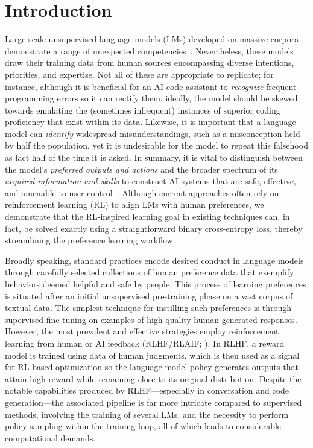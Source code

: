 \section{Introduction}
Large-scale unsupervised language models (LMs) developed on massive corpora demonstrate a range of unexpected competencies~\citep{chowdhery2022palm, brown2020language, touvron2023llama,bubeck2023sparks}. Nevertheless, these models draw their training data from human sources encompassing diverse intentions, priorities, and expertise. Not all of these are appropriate to replicate; for instance, although it is beneficial for an AI code assistant to \textit{recognize} frequent programming errors so it can rectify them, ideally, the model should be skewed towards emulating the (sometimes infrequent) instances of superior coding proficiency that exist within its data. Likewise, it is important that a language model can \textit{identify} widespread misunderstandings, such as a misconception held by half the population, yet it is undesirable for the model to repeat this falsehood as fact half of the time it is asked. In summary, it is vital to distinguish between the model's \emph{preferred outputs and actions} and the broader spectrum of its \textit{acquired information and skills} to construct AI systems that are safe, effective, and amenable to user control~\citep{ouyang2022training}. Although current approaches often rely on reinforcement learning (RL) to align LMs with human preferences, we demonstrate that the RL-inspired learning goal in existing techniques can, in fact, be solved exactly using a straightforward binary cross-entropy loss, thereby streamlining the preference learning workflow.

Broadly speaking, standard practices encode desired conduct in language models through carefully selected collections of human preference data that exemplify behaviors deemed helpful and safe by people. This process of learning preferences is situated after an initial unsupervised pre-training phase on a vast corpus of textual data. The simplest technique for instilling such preferences is through supervised fine-tuning on examples of high-quality human-generated responses. However, the most prevalent and effective strategies employ reinforcement learning from human or AI feedback (RLHF/RLAIF; \citep{christiano2017deep,bai2022constitutional}). In RLHF, a reward model is trained using data of human judgments, which is then used as a signal for RL-based optimization so the language model policy generates outputs that attain high reward while remaining close to its original distribution. Despite the notable capabilities produced by RLHF—especially in conversation and code generation—the associated pipeline is far more intricate compared to supervised methods, involving the training of several LMs, and the necessity to perform policy sampling within the training loop, all of which leads to considerable computational demands.

